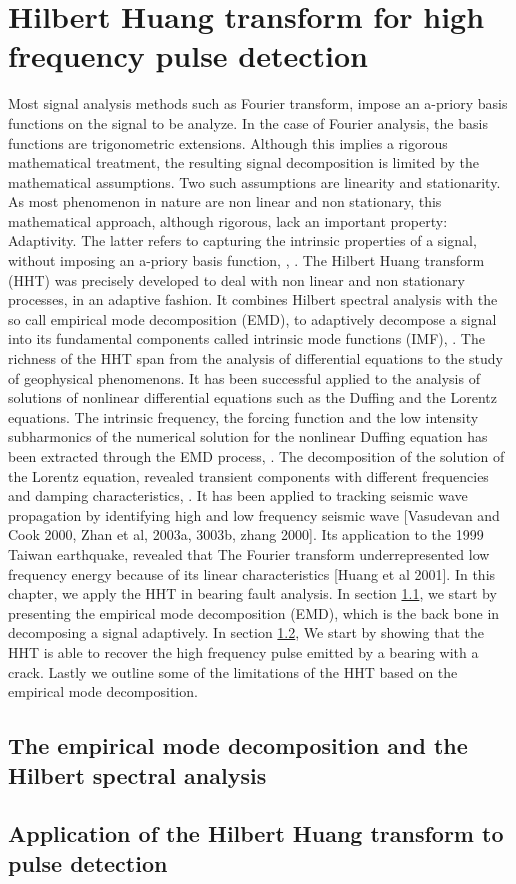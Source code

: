 \documentclass[../Main/thesis.tex]{subfiles}
\begin{document}
\chapter[Hilbert Huang transform for high frequency pulse detection]{Hilbert Huang transform for high frequency pulse detection}
\label{sec:hht}

Most signal analysis methods such as Fourier transform, impose an a-priory basis functions on the signal to be analyze. In the case of Fourier analysis, the basis functions are trigonometric extensions. Although this implies a rigorous mathematical treatment, the resulting signal decomposition is limited by the mathematical assumptions. Two such assumptions are linearity and stationarity. As most phenomenon in nature are non linear and non stationary, this mathematical approach, although rigorous, lack an important property: Adaptivity. The latter refers to capturing the intrinsic properties of a signal, without imposing an a-priory basis function, \cite{huang98}, \cite{huang08}. 
\justify 
The Hilbert Huang transform (HHT) was precisely developed to deal with non linear and non stationary processes, in an adaptive fashion. It combines Hilbert spectral analysis with the so call empirical mode decomposition (EMD), to adaptively decompose a signal into its fundamental components called intrinsic mode functions (IMF), \cite{huang98}.
The richness of the HHT span from the analysis of differential equations to the study of geophysical phenomenons. It has been successful applied to the analysis of solutions of nonlinear differential equations such as the Duffing and the Lorentz equations. The intrinsic frequency, the forcing function and the low intensity subharmonics of the numerical solution for the nonlinear Duffing equation has been extracted through the EMD process, \cite{huang98}. The decomposition of the solution of the Lorentz equation, revealed transient components with different frequencies and damping characteristics, \cite{huang98}. It has been applied to tracking seismic wave propagation by identifying high and low frequency seismic wave [Vasudevan and Cook 2000, Zhan et al, 2003a, 3003b, zhang 2000]. Its application to the 1999 Taiwan earthquake, revealed that The Fourier transform underrepresented low frequency energy because of its linear characteristics [Huang et al 2001]. In this chapter, we apply the HHT in bearing fault analysis.
\justify
In section \ref{sec:emd}, we start by presenting the empirical mode decomposition (EMD), which is the back bone in decomposing a signal adaptively. In section \ref{sec:pulse}, We start by showing that the HHT is able to recover the high frequency pulse emitted by a bearing with a crack. Lastly we outline some of the limitations of the HHT based on the empirical mode decomposition.
\justify
\section{The empirical mode decomposition and the Hilbert spectral analysis}
\label{sec:emd}

\section{Application of the Hilbert Huang transform to pulse detection }
\label{sec:pulse}



\blankpage
\end{document}
